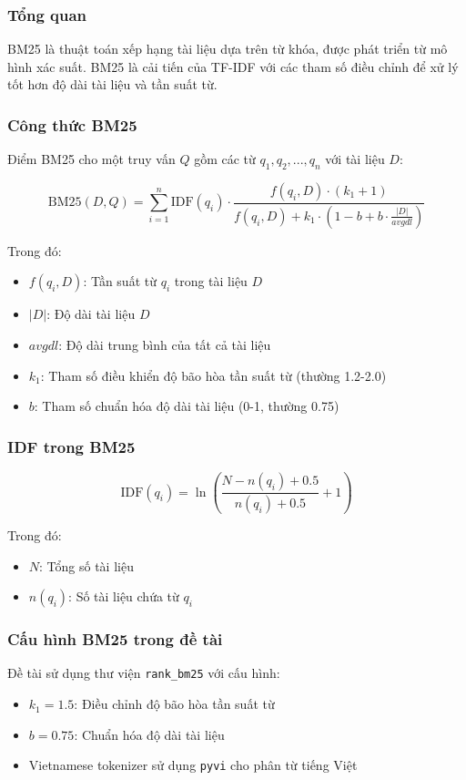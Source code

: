 \documentclass[../DoAn.tex]{subfiles}
\begin{document}
\subsubsection{Tổng quan}
BM25 là thuật toán xếp hạng tài liệu dựa trên từ khóa, được phát triển từ mô hình xác suất. BM25 là cải tiến của TF-IDF với các tham số điều chỉnh để xử lý tốt hơn độ dài tài liệu và tần suất từ.

\subsubsection{Công thức BM25}
Điểm BM25 cho một truy vấn $Q$ gồm các từ $q_1, q_2, ..., q_n$ với tài liệu $D$:

\begin{equation}
\text{BM25}(D, Q) = \sum_{i=1}^{n} \text{IDF}(q_i) \cdot \frac{f(q_i, D) \cdot (k_1 + 1)}{f(q_i, D) + k_1 \cdot (1 - b + b \cdot \frac{|D|}{avgdl})}
\end{equation}

Trong đó:
\begin{itemize}
    \item $f(q_i, D)$: Tần suất từ $q_i$ trong tài liệu $D$
    \item $|D|$: Độ dài tài liệu $D$
    \item $avgdl$: Độ dài trung bình của tất cả tài liệu
    \item $k_1$: Tham số điều khiển độ bão hòa tần suất từ (thường 1.2-2.0)
    \item $b$: Tham số chuẩn hóa độ dài tài liệu (0-1, thường 0.75)
\end{itemize}

\subsubsection{IDF trong BM25}
\begin{equation}
\text{IDF}(q_i) = \ln \left( \frac{N - n(q_i) + 0.5}{n(q_i) + 0.5} + 1 \right)
\end{equation}

Trong đó:
\begin{itemize}
    \item $N$: Tổng số tài liệu
    \item $n(q_i)$: Số tài liệu chứa từ $q_i$
\end{itemize}

\subsubsection{Cấu hình BM25 trong đề tài}
Đề tài sử dụng thư viện \texttt{rank\_bm25} với cấu hình:
\begin{itemize}
    \item $k_1 = 1.5$: Điều chỉnh độ bão hòa tần suất từ
    \item $b = 0.75$: Chuẩn hóa độ dài tài liệu
    \item Vietnamese tokenizer sử dụng \texttt{pyvi} cho phân từ tiếng Việt
\end{itemize}
\end{document}

